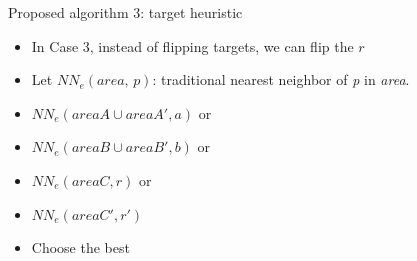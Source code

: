 \begin{frame}{Proposed algorithm 3: target heuristic}
  \begin{itemize}
    \item \small {In Case 3, instead of flipping targets, we can flip the $r$}
    \item \small{
Let $NN_e(\textit{area, p})$: traditional nearest neighbor of \textit{p} in \textit{area}.
    }
  \end{itemize}

\begin{minipage}{.35\textwidth}
  \begin{itemize}
    \item {} {$\scriptstyle NN_e(\scriptscriptstyle{areaA \cup areaA'}, \scriptstyle a)$ \small or}
    \item {} {$\scriptstyle NN_e(\scriptscriptstyle{areaB \cup areaB'}, \scriptstyle b)$ \small or}
    \item {} {$\scriptstyle NN_e(areaC, r)$ \small or}
    \item {} {$\scriptstyle NN_e(areaC', r')$}
    \item {} {\small Choose the best}
  \end{itemize}
\end{minipage}%
\begin{minipage}{.6\textwidth}
    \begin{adjustbox}{max totalsize={\textwidth}{\textheight}, right}
    \end{adjustbox}
\end{minipage}
\end{frame}

